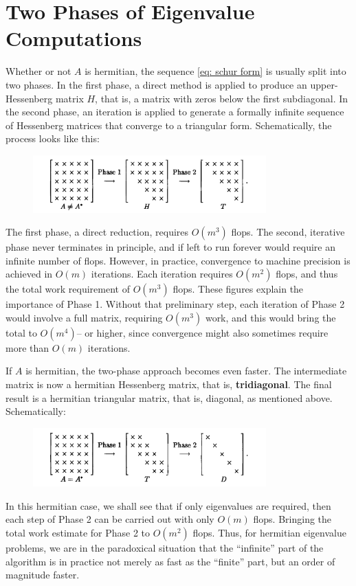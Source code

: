 \section{Two Phases of Eigenvalue Computations} 
Whether or not $A$ is hermitian, the sequence \eqref{eq: schur form} is usually split into two phases. In the first phase, a direct method is applied to produce an upper-Hessenberg matrix $H$, that is, a matrix with zeros below the first subdiagonal. In the second phase, an iteration is applied to generate a formally infinite sequence of Hessenberg matrices that converge to a triangular form. Schematically, the process looks like this: 
\begin{figure}[H]
    \centering
    \includegraphics[width=0.8\textwidth]{figures/25-1.png}
\end{figure}
The first phase, a direct reduction, requires $O(m^3)$ flops. The second, iterative phase never terminates in principle, and if left to run forever would require an infinite number of flops. However, in practice, convergence to machine precision is achieved in $O(m)$ iterations. Each iteration requires $O(m^2)$ flops, and thus the total work requirement of $O(m^3)$ flops. These figures explain the importance of Phase 1. Without that preliminary step, each iteration of Phase 2 would involve a full matrix, requiring $O(m^3)$ work, and this would bring the total to $O(m^4)$-- or higher, since convergence might also sometimes require more than $O(m)$ iterations.  

If $A$ is hermitian, the two-phase approach becomes even faster. The intermediate matrix is now a hermitian Hessenberg matrix, that is, \textbf{tridiagonal}. The final result is a hermitian triangular matrix, that is, diagonal, as mentioned above. Schematically: 
\begin{figure}[H]
    \centering
    \includegraphics[width=0.8\textwidth]{figures/25-2.png}
\end{figure}
In this hermitian case, we shall see that if only eigenvalues are required, then each step of Phase 2 can be carried out with only $O(m)$ flops. Bringing the total work estimate for Phase 2 to $O(m^2)$ flops. Thus, for hermitian eigenvalue problems, we are in the paradoxical situation that the ``infinite'' part of the algorithm is in practice not merely as fast as the ``finite'' part, but an order of magnitude faster.  

